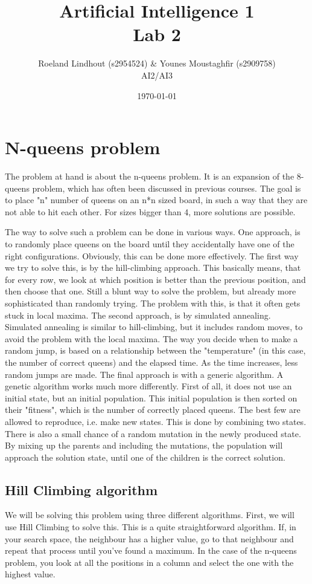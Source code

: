 \documentclass{article}
\title{Artificial Intelligence 1 \\ Lab 2}%
\author{Roeland Lindhout (s2954524) \& Younes Moustaghfir (s2909758) \\ AI2/AI3} %
\date{\today}%
\begin{document}
	
	\maketitle
	
	\section{N-queens problem}
	
	The problem at hand is about the n-queens problem. It is an expansion of the 8-queens problem, which has often been discussed in previous courses. The goal is to place "n" number of queens on an n*n sized board, in such a way that they are not able to hit each other. For sizes bigger than 4, more solutions are possible.
	
	The way to solve such a problem can be done in various ways. One approach, is to randomly place queens on the board until they accidentally have one of the right configurations. Obviously, this can be done more effectively. The first way we try to solve this, is by the hill-climbing approach. This basically means, that for every row, we look at which position is better than the previous position, and then choose that one. Still a blunt way to solve the problem, but already more sophisticated than randomly trying. The problem with this, is that it often gets stuck in local maxima. The second approach, is by simulated annealing. Simulated annealing is similar to hill-climbing, but it includes random moves, to avoid the problem with the local maxima. The way you decide when to make a random jump, is based on a relationship between the "temperature" (in this case, the number of correct queens) and the elapsed time. As the time increases, less random jumps are made. The final approach is with a generic algorithm. A genetic algorithm works much more differently. First of all, it does not use an initial state, but an initial population. This initial population is then sorted on their "fitness", which is the number of correctly placed queens. The best few are allowed to reproduce, i.e. make new states. This is done by combining two states. There is also a small chance of a random mutation in the newly produced state. By mixing up the parents and including the mutations, the population will approach the solution state, until one of the children is the correct solution.
		
	\subsection{Hill Climbing algorithm}
	We will be solving this problem using three different algorithms. First, we will use Hill Climbing to solve this. This is a quite straightforward algorithm. If, in your search space, the neighbour has a higher value, go to that neighbour and repeat that process until you've found a maximum. In the case of the n-queens problem, you look at all the positions in a column and select the one with the highest value.
	
\end{document}
